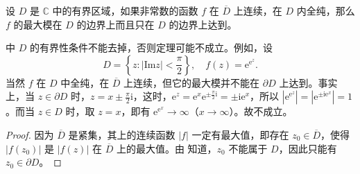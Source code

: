 \documentclass[../../main.tex]{subfiles}%
\begin{document}
\begin{theorem}\label{theorem:定理4.5.2}
设 \( D \) 是 \( \mathbb{C} \) 中的有界区域，如果非常数的函数 \( f \) 在 \( \overline{D} \) 上连续，在 \( D \) 内全纯，那么 \( f \) 的最大模在 \( D \) 的边界上而且只在 \( D \) 的边界上达到。
\end{theorem}
\begin{remark}
中 \( D \) 的有界性条件不能去掉，否则定理可能不成立。例如，设
\[
D = \left\{ z : |\text{Im} z| < \frac{\pi}{2} \right\},
\quad
f(z) = \mathrm{e}^{\mathrm{e}^z}.
\]
当然 \( f \) 在 \( D \) 中全纯，在 \( \overline{D} \) 上连续，但它的最大模并不能在 \( \partial D \) 上达到。事实上，当 \( z \in \partial D \) 时，\( z = x \pm \frac{\pi}{2}\mathrm{i} \)，这时，\( \mathrm{e}^z = \mathrm{e}^x \mathrm{e}^{\pm \frac{\pi}{2}\mathrm{i}} = \pm \mathrm{i}\mathrm{e}^x \)，所以 \( |\mathrm{e}^{\mathrm{e}^z}| = |\mathrm{e}^{\pm \mathrm{i}\mathrm{e}^x}| = 1 \)。而当 \( z \in D \) 时，取 \( z = x \)，即有 \( \mathrm{e}^{\mathrm{e}^x} \to \infty \)（\( x \to \infty \)）。故不成立。
\end{remark}
\begin{proof}
因为 \( \overline{D} \) 是紧集，其上的连续函数 \( |f| \) 一定有最大值，即存在 \( z_0 \in \overline{D} \)，使得 \( |f(z_0)| \) 是 \( |f(z)| \) 在 \( \overline{D} \) 上的最大值。由 知道，\( z_0 \) 不能属于 \( D \)，因此只能有 \( z_0 \in \partial D \)。 
\end{proof}
\end{document}
